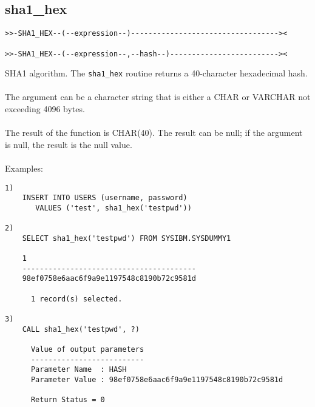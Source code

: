 \subsection{sha1\_hex} \label{sha1hex}
\begin{verbatim}
>>-SHA1_HEX--(--expression--)----------------------------------><

>>-SHA1_HEX--(--expression--,--hash--)-------------------------><
\end{verbatim}
SHA1 algorithm. The {\tt sha1\_hex} routine returns a 40-character hexadecimal hash.\\
\\
The argument can be a character string that is either a \mbox{CHAR} or \mbox{VARCHAR} not exceeding 4096 bytes.\\
\\
The result of the function is CHAR(40). The result can be null; if the argument is null, the result is the null value.\\
\\
Examples:
\begin{verbatim}
1)
    INSERT INTO USERS (username, password)
       VALUES ('test', sha1_hex('testpwd'))

2)
    SELECT sha1_hex('testpwd') FROM SYSIBM.SYSDUMMY1

    1
    ----------------------------------------
    98ef0758e6aac6f9a9e1197548c8190b72c9581d

      1 record(s) selected.

3)
    CALL sha1_hex('testpwd', ?)

      Value of output parameters
      --------------------------
      Parameter Name  : HASH
      Parameter Value : 98ef0758e6aac6f9a9e1197548c8190b72c9581d

      Return Status = 0
\end{verbatim}
\newpage
\hypertarget{hsha256}{}
